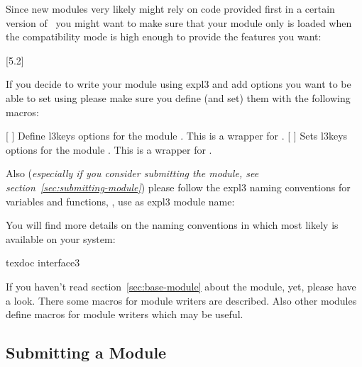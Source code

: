 \documentclass{chemmacros-manual}
\begin{document}
Since new modules very likely might rely on code provided first in a certain
version of \chemmacros\ you might want to make sure that your module only is
loaded when the compatibility mode is high enough to provide the features you
want:
\begin{sourcecode}
  [5.2]
\end{sourcecode}

If you decide to write your module  using expl3 and add
options you want to be able to set using
 please make sure you define (and set)
them with the following macros:
\begin{commands}
  [  ]
    Define l3keys options for the module .  This is a wrapper for
      .
  [  ]
    Sets l3keys options for the module .  This is a wrapper for
      .
\end{commands}
Also (\emph{especially if you consider submitting the module, see
  section~\vref{sec:submitting-module}}) please follow the expl3 naming
conventions for variables and functions, \ie, use  as expl3
module name:
You will find more details on the naming conventions in 
which most likely is available on your system:
\begin{lbash}
  texdoc interface3
\end{lbash}
If you haven't read section~\vref{sec:base-module} about the 
module, yet, please have a look.  There some macros for module writers are
described.  Also other modules define macros for module writers which may be
useful.

\subsection{Submitting a Module}\label{sec:submitting-module}
\end{document}
